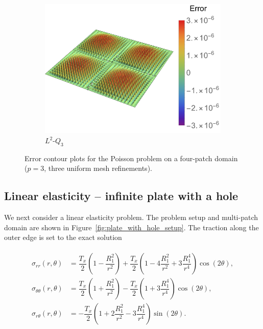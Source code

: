 \begin{figure}
\begin{subfigure}[t]{.45\linewidth}
		\includegraphics[scale=.52]{four_patch_poisson_L2_contour}
		\caption{$L^2$-$Q_3$}
	\end{subfigure}
	\caption{Error contour plots for the Poisson problem on a four-patch domain ($p=3$, three uniform mesh refinements). }\label{fig:contour_Poisson}
\end{figure}

\subsection{Linear elasticity -- infinite plate with a hole}\label{sec:plate_with_a_hole}

We next consider a linear elasticity problem. The problem setup and multi-patch domain are shown in Figure~\ref{fig:plate_with_hole_setup}. The traction along the outer edge is set to the exact solution

\begin{align}
	\begin{split}
		\sigma_{rr}(r,\theta)&=\dfrac{T_x}{2}(1-\dfrac{R_1^2}{r^2})+\dfrac{T_x}{2}(1-4\dfrac{R_1^2}{r^2}+3\dfrac{R_1^4}{r^4})\cos(2\theta),\\
		\sigma_{\theta\theta}(r,\theta)&=\dfrac{T_x}{2}(1+\dfrac{R_1^2}{r^2})-\dfrac{T_x}{2}(1+3\dfrac{R_1^4}{r^4})\cos(2\theta),\\
		\sigma_{r\theta}(r,\theta)&=-\dfrac{T_x}{2}(1+2\dfrac{R_1^2}{r^2}-3\dfrac{R_1^4}{r^4})\sin(2\theta).
	\end{split}
\end{align}

